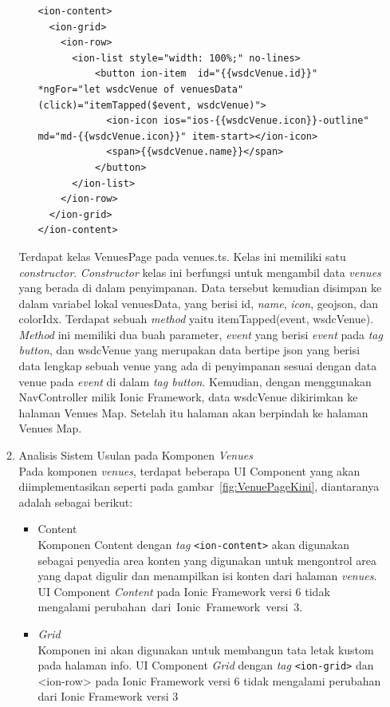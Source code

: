 \begin{enumerate}
\begin{enumerate}
\begin{itemize}
\begin{lstlisting}[label={lst:contentVenues}, caption=\textit{Content} pada venues.html]
<ion-content>
  <ion-grid>
    <ion-row>
      <ion-list style="width: 100%;" no-lines>
          <button ion-item  id="{{wsdcVenue.id}}" *ngFor="let wsdcVenue of venuesData" (click)="itemTapped($event, wsdcVenue)">
            <ion-icon ios="ios-{{wsdcVenue.icon}}-outline" md="md-{{wsdcVenue.icon}}" item-start></ion-icon>
            <span>{{wsdcVenue.name}}</span>
          </button>
      </ion-list>
    </ion-row>
  </ion-grid>
</ion-content>
\end{lstlisting}
	\end{itemize}

	Terdapat kelas VenuesPage pada venues.ts. Kelas ini memiliki satu \textit{constructor}. \textit{Constructor} kelas ini berfungsi untuk mengambil data \textit{venues} yang berada di dalam penyimpanan. Data tersebut kemudian disimpan ke dalam variabel lokal venuesData, yang berisi id, \textit{name}, \textit{icon}, geojson, dan colorIdx. 
	Terdapat sebuah \textit{method} yaitu itemTapped(event, wsdcVenue). \textit{Method} ini memiliki dua buah parameter, \textit{event} yang berisi \textit{event} pada \textit{tag button}, dan wsdcVenue yang merupakan data bertipe json yang berisi data lengkap sebuah venue yang ada di penyimpanan sesuai dengan data venue pada \textit{event} di dalam \textit{tag button}. Kemudian, dengan menggunakan NavController milik Ionic Framework, data wsdcVenue dikirimkan ke halaman Venues Map. Setelah itu halaman akan berpindah ke halaman Venues Map.
		\item  Analisis Sistem Usulan pada Komponen \textit{Venues} \\
		Pada komponen \textit{venues}, terdapat beberapa UI Component yang akan diimplementasikan seperti pada gambar~\ref{fig:VenuePageKini}, diantaranya adalah sebagai berikut:
		\begin{itemize}
			\item Content \\
		Komponen Content dengan \textit{tag} \texttt{<ion-content>} akan digunakan sebagai penyedia area konten yang digunakan untuk mengontrol area yang dapat digulir dan menampilkan isi konten dari halaman \textit{venues}. UI Component \textit{Content} pada Ionic Framework versi 6 tidak mengalami perubahan~dari~Ionic~Framework~versi~3.
		
			\item \textit{Grid} \\
		Komponen ini akan digunakan untuk membangun tata letak kustom pada halaman info. UI Component \textit{Grid} dengan \textit{tag} \texttt{<ion-grid>} dan {<ion-row>} pada Ionic Framework versi 6 tidak mengalami perubahan dari Ionic Framework versi 3


\end{itemize}
\end{enumerate}
\end{enumerate}
